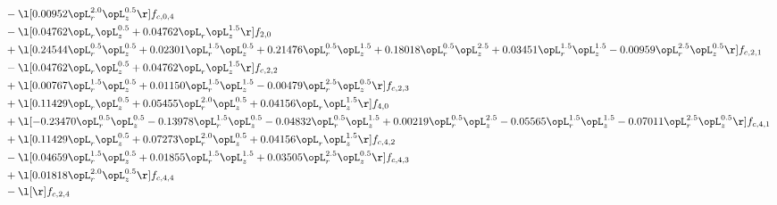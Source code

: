 \begin{alignat}{2}
& - \l[  0.00952 \opL_r^{2.0} \opL_z^{0.5}  \r] f_{c,0,4} \nonumber \\ 
& - \l[  0.04762 \opL_r \opL_z^{0.5} +  0.04762 \opL_r \opL_z^{1.5}  \r] f_{2,0} \nonumber \\ 
& + \l[  0.24544 \opL_r^{0.5} \opL_z^{0.5} +  0.02301 \opL_r^{1.5} \opL_z^{0.5} +  0.21476 \opL_r^{0.5} \opL_z^{1.5} +  0.18018 \opL_r^{0.5} \opL_z^{2.5} +  0.03451 \opL_r^{1.5} \opL_z^{1.5}   -0.00959 \opL_r^{2.5} \opL_z^{0.5}  \r] f_{c,2,1} \nonumber \\ 
& - \l[  0.04762 \opL_r \opL_z^{0.5} +  0.04762 \opL_r \opL_z^{1.5}  \r] f_{c,2,2} \nonumber \\ 
& + \l[  0.00767 \opL_r^{1.5} \opL_z^{0.5} +  0.01150 \opL_r^{1.5} \opL_z^{1.5}   -0.00479 \opL_r^{2.5} \opL_z^{0.5}  \r] f_{c,2,3} \nonumber \\ 
& + \l[  0.11429 \opL_r \opL_z^{0.5} +  0.05455 \opL_r^{2.0} \opL_z^{0.5} +  0.04156 \opL_r \opL_z^{1.5}  \r] f_{4,0} \nonumber \\ 
& + \l[  -0.23470 \opL_r^{0.5} \opL_z^{0.5}   -0.13978 \opL_r^{1.5} \opL_z^{0.5}   -0.04832 \opL_r^{0.5} \opL_z^{1.5} +  0.00219 \opL_r^{0.5} \opL_z^{2.5}   -0.05565 \opL_r^{1.5} \opL_z^{1.5}   -0.07011 \opL_r^{2.5} \opL_z^{0.5}  \r] f_{c,4,1} \nonumber \\ 
& + \l[  0.11429 \opL_r \opL_z^{0.5} +  0.07273 \opL_r^{2.0} \opL_z^{0.5} +  0.04156 \opL_r \opL_z^{1.5}  \r] f_{c,4,2} \nonumber \\ 
& - \l[  0.04659 \opL_r^{1.5} \opL_z^{0.5} +  0.01855 \opL_r^{1.5} \opL_z^{1.5} +  0.03505 \opL_r^{2.5} \opL_z^{0.5}  \r] f_{c,4,3} \nonumber \\ 
& + \l[  0.01818 \opL_r^{2.0} \opL_z^{0.5}  \r] f_{c,4,4} \nonumber \\ 
& - \l[  \r] f_{c,2,4} \nonumber \\ 
\end{alignat} 


